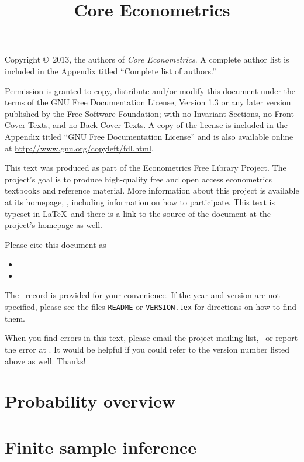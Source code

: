 \documentclass[oneside,openany,notitlepage,nohyper]{tufte-book}
\title{Core Econometrics}
\begin{document}
\maketitle

\bigskip\noindent%
Copyright \copyright\ 2013, the authors of \textit{Core Econometrics}.
A complete author list is included in the Appendix titled ``Complete
list of authors.''

Permission is granted to copy, distribute and/or modify this document
under the terms of the GNU Free Documentation License, Version 1.3 or
any later version published by the Free Software Foundation; with no
Invariant Sections, no Front-Cover Texts, and no Back-Cover Texts.  A
copy of the license is included in the Appendix titled ``GNU Free
Documentation License'' and is also available online at
\url{http://www.gnu.org/copyleft/fdl.html}.

This text was produced as part of the Econometrics Free Library
Project.  The project's goal is to produce high-quality free and
open access econometrics textbooks and reference material.  More
information about this project is available at its homepage,
\homepage, including information on how
to participate.  This text is typeset in \LaTeX\ and there is a link
to the source of the document at the project's homepage as well.

Please cite this document as
\begin{itemize}
\item[] 
\item[] 
\end{itemize}
The \BibTeX\ record is provided for your convenience.
If the year and version are not specified, please see the files
\texttt{README} or \texttt{VERSION.tex} for directions on how to
find them.

When you find errors in this text, please email the project mailing
list, \maillist\ or report the error at \bugtrack.  It would be
helpful if you could refer to the version number listed above as well.
Thanks!

\tableofcontents
\listoftables
\listoffigures

\part{Probability overview}




\part{Finite sample inference}










\end{document}
